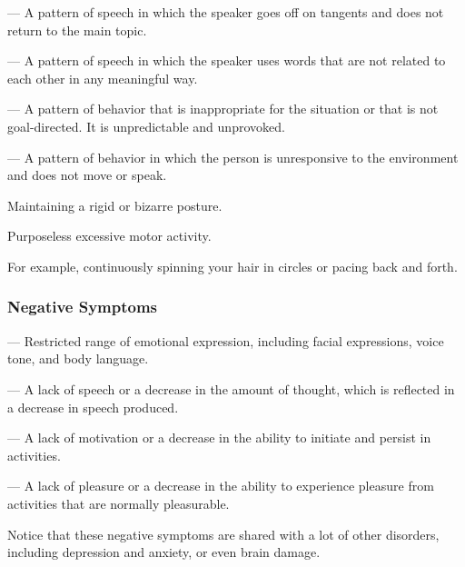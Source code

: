 \begin{coloredlist}
\begin{coloredlist}
        \item {} — A pattern of speech in which the speaker goes off on tangents and does not return to the main topic.
        \item {} — A pattern of speech in which the speaker uses words that are not related to each other in any meaningful way.
    \end{coloredlist}
    \item {} — A pattern of behavior that is inappropriate for the situation or that is not goal-directed. It is unpredictable and unprovoked.
    \item {} — A pattern of behavior in which the person is unresponsive to the environment and does not move or speak.
    \begin{coloredlist}
        \item Maintaining a rigid or bizarre posture.
        \item Purposeless excessive motor activity.
        \begin{coloredlist}
            \item For example, continuously spinning your hair in circles or pacing back and forth.
        \end{coloredlist}
    \end{coloredlist}
\end{coloredlist}

\subsubsection{Negative Symptoms}

\begin{coloredlist}
    \item {} — Restricted range of emotional expression, including facial expressions, voice tone, and body language.
    \item {} — A lack of speech or a decrease in the amount of thought, which is reflected in a decrease in speech produced.
    \item {} — A lack of motivation or a decrease in the ability to initiate and persist in activities.
    \item {} — A lack of pleasure or a decrease in the ability to experience pleasure from activities that are normally pleasurable.
    \item Notice that these negative symptoms are shared with a lot of other disorders, including depression and anxiety, or even brain damage.
\end{coloredlist}

